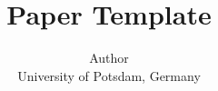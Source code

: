 \documentclass[a4paper]{article}
\begin{document}
\title{Paper Template}

\author{%
  Author\\
  University of Potsdam, Germany
}

\maketitle


%
%
%
%
%

\printbibliography{}
\end{document}
